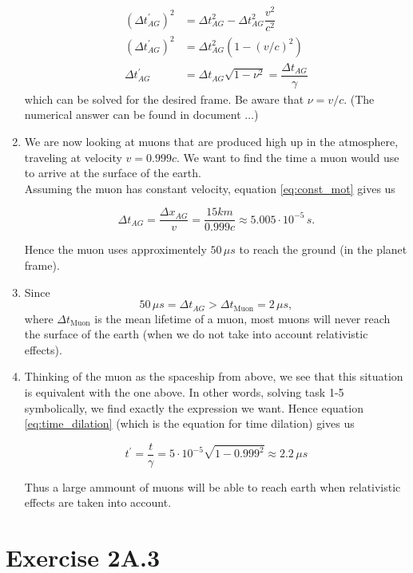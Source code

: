 \documentclass[a4paper,10pt,english]{article}
\begin{document}
\begin{enumerate}
\begin{align}
(\Delta t_{AG}^{\prime})^2&=\Delta t_{AG}^2-\Delta t_{AG}^2\dfrac{v^{2}}{c^2} \nonumber\\
(\Delta t_{AG}^{\prime})^2&=\Delta t_{AG}^2\left(1-(v/c)^2\right) \nonumber\\
\Delta t_{AG}^{\prime}&=\Delta t_{AG}\sqrt{1-\nu^2}=\dfrac{\Delta t_{AG}}{\gamma}\label{eq:time_dilation}
\end{align}
which can be solved for the desired frame. Be aware that $\nu=v/c$. (The numerical answer can be found in document $\ldots$)
\item We are now looking at muons that are produced high up in the atmosphere, traveling at velocity $v=0.999c$. We want to find the time a muon would use to arrive at the surface of the earth.\\
Assuming the muon has constant velocity, equation \ref{eq:const_mot} gives us

\begin{equation*}
\Delta t_{AG}=\dfrac{\Delta x_{AG}}{v}=\dfrac{15km}{0.999c}\approx5.005\cdot 10^{-5}\,s.
\end{equation*}

Hence the muon uses approximentely $50\,\mu s$ to reach the ground (in the planet frame).
\item Since \[50\,\mu s=\Delta t_{AG}>\Delta t_{\text{Muon}}=2\,\mu s,\] where $\Delta t_{\text{Muon}}$ is the mean lifetime of a muon, most muons will never reach the surface of the earth (when we do not take into account relativistic effects).
\item Thinking of the muon as the spaceship from above, we see that this situation is equivalent with the one above. In other words, solving task 1-5 symbolically, we find exactly the expression we want. Hence equation \ref{eq:time_dilation} (which is the equation for time dilation) gives us

\begin{equation*}
t^{\prime}=\dfrac{t}{\gamma}=5\cdot 10^{-5}\sqrt{1-0.999^{2}}\approx2.2\,\mu s
\end{equation*}

Thus a large ammount of muons will be able to reach earth when relativistic effects are taken into account.
\end{enumerate}
%
%
%
%
%
%
%
%
\section*{Exercise 2A.3}
\end{document}
